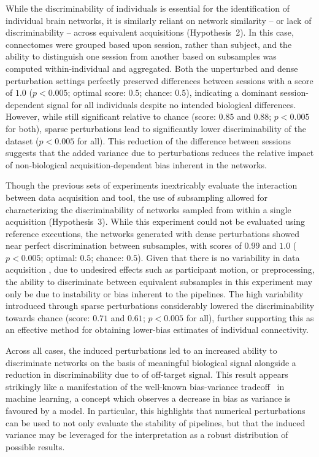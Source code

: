 \documentclass[fleqn,10pt]{SelfArx} %
\newcommand{\new}[1]{{\color{blue} #1}}
\begin{document}
While the \new{discriminability} of individuals is essential for the identification of \new{individual} brain networks,
it is similarly reliant on
network similarity \new{– or lack of discriminability –} across equivalent acquisitions (Hypothesis~2). In this case,
connectomes were grouped based upon session, rather than subject, and the ability to distinguish one session from
another \new{based on subsamples} was computed within-individual and aggregated. Both the unperturbed and \new{dense}
perturbation settings perfectly preserved differences between sessions with a score of $1.0$ ($p < 0.005$; optimal
score: $0.5$; chance: $0.5$), indicating a dominant session-dependent signal for all individuals despite no intended
biological differences. However, while still significant relative to chance (score: $0.85$ and $0.88$; $p < 0.005$ for
both), \new{sparse} perturbations lead to significantly lower discriminability of the dataset ($p < 0.005$ for all).
This reduction of the difference between sessions suggests that \new{the added} variance \new{due to} perturbations
reduces the \new{relative} impact of non-biological acquisition-dependent bias inherent in the \new{networks}.

Though the previous sets of experiments inextricably evaluate the interaction between \new{data acquisition} and tool,
the use of subsampling allowed for characterizing the discriminability of networks sampled from within a single
acquisition (Hypothesis~3). While this experiment could not be evaluated using reference executions, the \new{networks
generated with dense} perturbations showed near perfect discrimination between subsamples, with scores of $0.99$ and
$1.0$ ($p < 0.005$; optimal: $0.5$; chance: $0.5$). Given that there is no variability in data acquisition\new{, due to
undesired effects such as participant motion,} or preprocessing, the \new{ability to discriminate between equivalent
subsamples} in this experiment may only be due to instability or bias inherent to the pipelines. The high variability
introduced through \new{sparse} perturbations considerably lowered the \new{discriminability} towards chance (score:
$0.71$ and $0.61$; $p < 0.005$ for all), further supporting this as an effective method for obtaining lower-bias
estimates of individual connectivity.

Across all cases, the induced perturbations \new{led to an increased ability to discriminate networks on the basis} of
meaningful biological signal alongside a reduction \new{in discriminability due to} of off-target signal. This result
appears strikingly like a manifestation of the well-known bias-variance
tradeoff~\cite{geman1992neural} in machine learning, a concept which observes a decrease in bias as variance is
favoured by a model. In particular, this highlights that numerical perturbations can be used to not only evaluate the
stability of pipelines, but that the induced variance may be leveraged for the interpretation as a robust distribution
of possible results.
\end{document}
